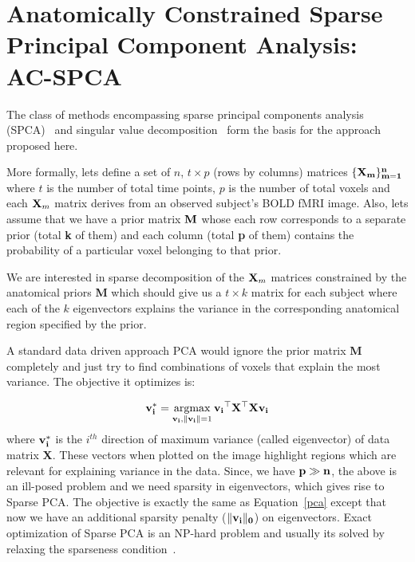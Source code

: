 \documentclass{llncs}
\newcommand{\argmax}{\operatornamewithlimits{argmax}}
\begin{document}





\section{ Anatomically Constrained Sparse Principal Component Analysis: AC-SPCA}
The class of methods encompassing sparse principal components analysis (SPCA)~\cite{zou2006sparse,Witten2009b,d2007direct} and singular value decomposition~\cite{sill2011robust} form the basis for the approach proposed here. 


More formally, lets define a set of $n$, $t\times p$ (rows by columns) matrices $\{\bf X_m\}_{m=1}^n$ where $t$ is the number of total time points, $p$ is the number of total voxels and each ${\bf X}_m$ matrix derives from an observed subject's BOLD fMRI image.
 Also, lets assume that we have a prior matrix {$\bf M$} whose each row corresponds to a separate prior (total {\bf k} of them) and each column (total {\bf p} of them) contains the probability of a particular voxel belonging to that prior. 


We are interested in sparse decomposition of the ${\bf X}_m$ matrices constrained by the anatomical priors {\bf M} which should give us a $t \times k$ matrix for each subject where each of the $k$ eigenvectors explains the variance in the corresponding anatomical region specified by the prior.


A standard data driven approach PCA would ignore the prior matrix {\bf M} completely and just try to find combinations of voxels that explain the most variance. The objective it optimizes is:

\begin{equation}
{\bf v_i^*}= \argmax_{{\bf v_i},{\bf \|v_i\|}=1} {\bf v_i}^{\top}{\bf X^{\top}X}{\bf v_i}
\label{pca}
\end{equation}
where {$\bf v_i^*$} is the $i^{th}$ direction of maximum variance (called eigenvector) of data matrix {\bf X}. These vectors when plotted on the image highlight regions which are
relevant for explaining variance in the data. Since, we have ${\bf p \gg n}$, the above is an ill-posed problem and we need sparsity in eigenvectors, which gives rise to Sparse PCA. The objective is exactly the same as Equation~\ref{pca} except that now we have an additional sparsity penalty ($\|\bf v _i\|_0$) on eigenvectors.  Exact optimization of Sparse PCA is an NP-hard problem and usually its solved by relaxing the sparseness condition~\cite{zou2006sparse,Witten2009b}.
\end{document}
